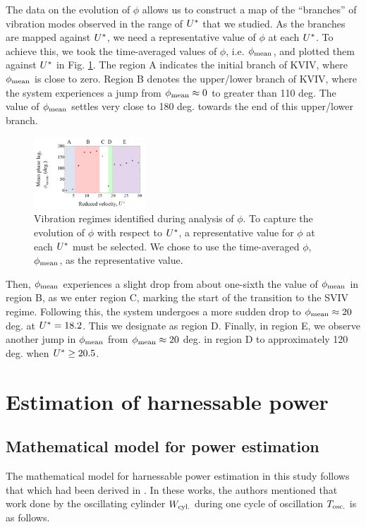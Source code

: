 \documentclass[a4paper,fleqn]{cas-sc}
\begin{document}
The data on the evolution of $\phi$ allows us to construct a map of the ``branches'' of vibration modes observed in the range of $U^{*}$ that we studied. As the branches are mapped against $U^{*}$, we need a representative value of $\phi$ at each $U^{*}$. To achieve this, we took the time-averaged values of $\phi$, i.e. $\phi_{\text{mean}}$, and plotted them against $U^{*}$ in Fig. \ref{fig:phaseAngleRegime}. The region A indicates the initial branch of  KVIV, where  $\phi_{\text{mean}}$ is close to zero. Region B denotes the upper/lower branch of  KVIV, where the system experiences a jump from  $\phi_{\text{mean}} \approx 0$ to greater than 110 deg. The value of $\phi_{\text{mean}}$ settles very close to 180 deg. towards the end of this upper/lower branch.

\begin{figure}
  \centering
  \includegraphics[width=0.37\textwidth]{figs/figure19}
  \caption{Vibration regimes identified during analysis of $\phi$. To capture the evolution of $\phi$ with respect to $U^{*}$, a representative value for $\phi$ at each $U^{*}$ must be selected. We chose to use the time-averaged $\phi$, $\phi_{\text{mean}}$, as the representative value.}
  \label{fig:phaseAngleRegime}
\end{figure}

Then, $\phi_{\text{mean}}$ experiences a slight drop from about one-sixth the value of $\phi_{\text{mean}}$ in region B, as we enter region C, marking the start of the transition to the SVIV regime. Following this, the system undergoes a more sudden drop to $\phi_{\text{mean}} \approx 20$ deg. at $U^{*} = 18.2$. This we designate as region D. Finally, in region E, we observe another jump in $\phi_{\text{mean}}$ from $\phi_{\text{mean}} \approx 20$ deg. in region D to approximately 120 deg. when $U^{*} \geq 20.5$.


\section{Estimation of harnessable power} \label{sec:estimPow}
\subsection{Mathematical model for power estimation} \label{ssec:mathModel}
The mathematical model for harnessable power estimation in this study follows that which had been derived in \citet{Raghavanetal2007}. In these works, the authors mentioned that work done by the oscillating cylinder $W_{\text{cyl.}}$ during one cycle of oscillation $T_{\text{osc.}}$ is as follows.
\end{document}
